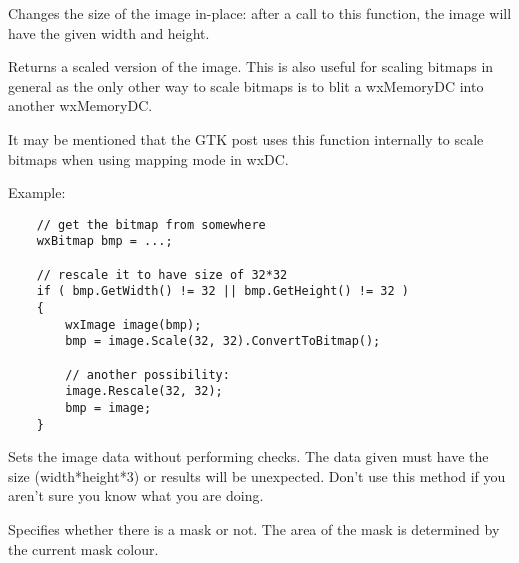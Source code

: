 \label{wximagerescale}


Changes the size of the image in-place: after a call to this function, the
image will have the given width and height.



\label{wximagescale}


Returns a scaled version of the image. This is also useful for
scaling bitmaps in general as the only other way to scale bitmaps
is to blit a wxMemoryDC into another wxMemoryDC.

It may be mentioned that the GTK post uses this function internally
to scale bitmaps when using mapping mode in wxDC. 

Example:

\begin{verbatim}
    // get the bitmap from somewhere
    wxBitmap bmp = ...;

    // rescale it to have size of 32*32
    if ( bmp.GetWidth() != 32 || bmp.GetHeight() != 32 )
    {
        wxImage image(bmp);
        bmp = image.Scale(32, 32).ConvertToBitmap();

        // another possibility:
        image.Rescale(32, 32);
        bmp = image;
    }

\end{verbatim}



\label{wximagesetdata}


Sets the image data without performing checks. The data given must have
the size (width*height*3) or results will be unexpected. Don't use this
method if you aren't sure you know what you are doing.

\label{wximagesetmask}


Specifies whether there is a mask or not. The area of the mask is determined by the current mask colour.

